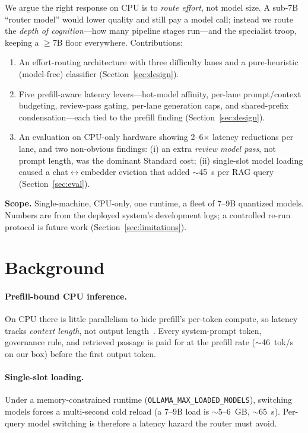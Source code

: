 \documentclass[10pt,twocolumn]{article}
\begin{document}
We argue the right response on CPU is to \emph{route effort}, not model
size. A sub-7B ``router model'' would lower quality and still pay a model
call; instead we route the \emph{depth of cognition}---how many pipeline
stages run---and the specialist troop, keeping a $\geq$7B floor everywhere.
Contributions:
\begin{enumerate}
  \item An effort-routing architecture with three difficulty lanes and a
        pure-heuristic (model-free) classifier (Section~\ref{sec:design}).
  \item Five prefill-aware latency levers---hot-model affinity, per-lane
        prompt/context budgeting, review-pass gating, per-lane generation
        caps, and shared-prefix condensation---each tied to the prefill
        finding (Section~\ref{sec:design}).
  \item An evaluation on CPU-only hardware showing 2--6$\times$ latency
        reductions per lane, and two non-obvious findings: (i) an extra
        \emph{review model pass}, not prompt length, was the dominant
        Standard cost; (ii) single-slot model loading caused a
        chat$\leftrightarrow$embedder eviction that added $\sim$45~s per
        RAG query (Section~\ref{sec:eval}).
\end{enumerate}

\noindent\textbf{Scope.} Single-machine, CPU-only, one runtime, a fleet of
7--9B quantized models. Numbers are from the deployed system's development
logs; a controlled re-run protocol is future work
(Section~\ref{sec:limitations}).

\section{Background}
\label{sec:background}

\paragraph{Prefill-bound CPU inference.}
On CPU there is little parallelism to hide prefill's per-token compute, so
latency tracks \emph{context length}, not output length~\cite{khan2026prefill}.
Every system-prompt token, governance rule, and retrieved passage is paid
for at the prefill rate ($\sim$46~tok/s on our box) before the first output
token.

\paragraph{Single-slot loading.}
Under a memory-constrained runtime (\texttt{OLLAMA\_MAX\_LOADED\_MODELS}),
switching models forces a multi-second cold reload (a 7--9B load is
$\sim$5--6~GB, $\sim$65~s). Per-query model switching is therefore a
latency hazard the router must avoid.
\end{document}

